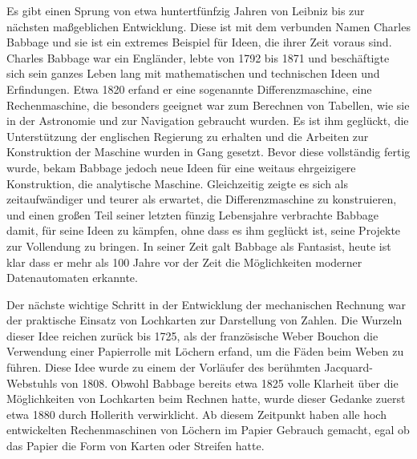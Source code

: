 {
Es gibt einen Sprung von etwa huntertfünfzig Jahren von Leibniz bis zur nächsten maßgeblichen Entwicklung. Diese ist mit dem verbunden Namen Charles Babbage und sie ist ein extremes Beispiel für Ideen, die ihrer Zeit voraus sind. Charles Babbage war ein Engländer, lebte von 1792 bis 1871 und beschäftigte sich sein ganzes Leben lang mit mathematischen und technischen Ideen und Erfindungen. Etwa 1820 erfand er eine sogenannte Differenzmaschine, eine Rechenmaschine, die besonders geeignet war zum Berechnen von Tabellen, wie sie in der Astronomie und zur Navigation gebraucht wurden. Es ist ihm geglückt, die Unterstützung der englischen Regierung zu erhalten und die Arbeiten zur Konstruktion der Maschine wurden in Gang gesetzt. Bevor diese vollständig fertig wurde, bekam Babbage jedoch neue Ideen für eine weitaus ehrgeizigere Konstruktion, die analytische Maschine. Gleichzeitig zeigte es sich als zeitaufwändiger und teurer als erwartet, die Differenzmaschine zu konstruieren, und einen großen Teil seiner letzten fünzig Lebensjahre verbrachte Babbage damit, für seine Ideen zu kämpfen, ohne dass es ihm geglückt ist, seine Projekte zur Vollendung zu bringen. In seiner Zeit galt Babbage als Fantasist, heute ist klar dass er mehr als 100 Jahre vor der Zeit die Möglichkeiten moderner Datenautomaten erkannte. 

Der nächste wichtige Schritt in der Entwicklung der mechanischen Rechnung war der praktische Einsatz von Lochkarten zur Darstellung von Zahlen. Die Wurzeln dieser Idee reichen zurück bis 1725, als der französische Weber Bouchon die Verwendung einer Papierrolle mit Löchern erfand, um die Fäden beim Weben zu führen. Diese Idee wurde zu einem der Vorläufer des berühmten Jacquard-Webstuhls von 1808. Obwohl Babbage bereits etwa 1825 volle Klarheit über die Möglichkeiten von Lochkarten beim Rechnen hatte, wurde dieser Gedanke zuerst etwa 1880 durch Hollerith verwirklicht. Ab diesem Zeitpunkt haben alle hoch entwickelten Rechenmaschinen von Löchern im Papier Gebrauch gemacht, egal ob das Papier die Form von Karten oder Streifen hatte.
}



